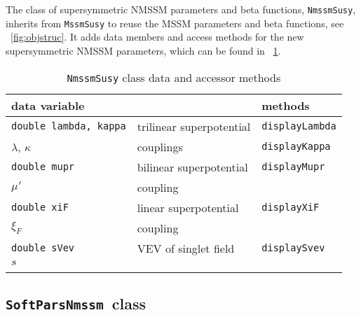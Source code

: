 \documentclass[final,3p,times,pdflatex]{elsarticle}
\def\code#1{\small{\tt #1}\normalsize}
\begin{document}
The class of supersymmetric NMSSM parameters and beta functions,
\code{NmssmSusy}, inherits from \code{MssmSusy} to reuse the MSSM
parameters and beta functions, see \figurename~\ref{fig:objstruc}.  It
adds data members and access methods for the new supersymmetric NMSSM
parameters, which can be found in \tablename~\ref{tab:nmssmsusy}.
%
\begin{table}
  \centering
  \begin{tabular}{lll}
    data variable & & methods \\\hline
    \code{\small double lambda, kappa} & trilinear superpotential &
    \code{\small displayLambda}
    \\
    $\lambda$, $\kappa$ & couplings & \code{\small displayKappa}
    \\\hline
    \code{\small double mupr} & bilinear superpotential &
    \code{\small displayMupr}
    \\
    $\mu'$ & coupling &
    \\\hline
    \code{\small double xiF} & linear superpotential &
    \code{\small displayXiF}
    \\
    $\xi_F$ & coupling &
    \\\hline
    \code{\small double sVev} & VEV of singlet field &
    \code{\small displaySvev}
    \\
    $s$ & &
    \\\hline
    \normalsize
  \end{tabular}
  \caption{\code{NmssmSusy} class data and accessor methods
    \label{tab:nmssmsusy}}
\end{table}

\subsection{\code{SoftParsNmssm}~class}
\label{nmssmsoftpars}
\end{document}
